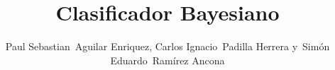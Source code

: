 \documentclass[10pt,journal,compsoc]{IEEEtran}\usepackage[T1]{fontenc}                              %
\begin{document}
%
\title{Clasificador Bayesiano}
%
%
%
%

\author{Paul Sebastian~Aguilar Enriquez,
        Carlos Ignacio~Padilla Herrera
        y~Simón Eduardo~Ramírez Ancona%
}

% 
%
\end{document}
